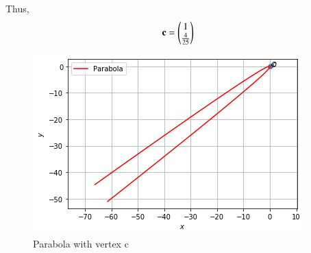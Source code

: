 \documentclass[journal,12pt,twocolumn]{IEEEtran}
\begin{document}
Thus,
\begin{align}
    \vec{c} = \myvec{1\\\frac{4}{25}} %
\end{align}
\renewcommand{\thefigure}{1}
\begin{figure}[h!]
    \centering
    \includegraphics[width=\columnwidth]{A6.png}
    \caption{Parabola with vertex c}
    \label{fig:fig1}
\end{figure}
\end{document}
